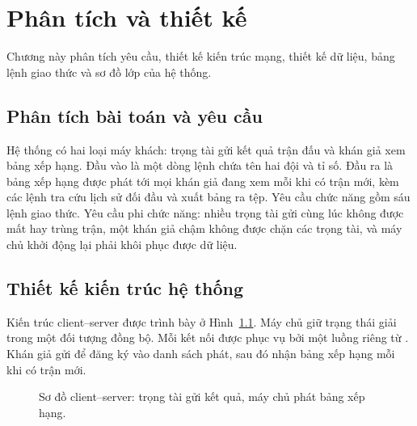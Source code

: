 \chapter{Phân tích và thiết kế}
\label{ch:thietke}

\begin{muctieu}
Chương này phân tích yêu cầu, thiết kế kiến trúc mạng, thiết kế dữ liệu, bảng
lệnh giao thức và sơ đồ lớp của hệ thống.
\end{muctieu}

\section{Phân tích bài toán và yêu cầu}

Hệ thống có hai loại máy khách: trọng tài gửi kết quả trận đấu và khán giả xem
bảng xếp hạng. Đầu vào là một dòng lệnh  chứa tên hai đội và tỉ
số. Đầu ra là bảng xếp hạng được phát tới mọi khán giả đang xem mỗi khi có trận
mới, kèm các lệnh tra cứu lịch sử đối đầu và xuất bảng ra tệp. Yêu cầu chức
năng gồm sáu lệnh giao thức. Yêu cầu phi chức năng: nhiều trọng tài gửi cùng
lúc không được mất hay trùng trận, một khán giả chậm không được chặn các trọng
tài, và máy chủ khởi động lại phải khôi phục được dữ liệu.

\section{Thiết kế kiến trúc hệ thống}

Kiến trúc client--server được trình bày ở Hình~\ref{fig:cs}. Máy chủ giữ
trạng thái giải trong một đối tượng  đồng bộ. Mỗi kết nối được
phục vụ bởi một luồng riêng từ . Khán giả gửi
 để đăng ký vào danh sách phát, sau đó nhận bảng xếp hạng mỗi khi
có trận mới.

\begin{figure}[H]
\centering
{}
\caption{Sơ đồ client--server: trọng tài gửi kết quả, máy chủ phát bảng xếp hạng.}
\label{fig:cs}
\end{figure}

